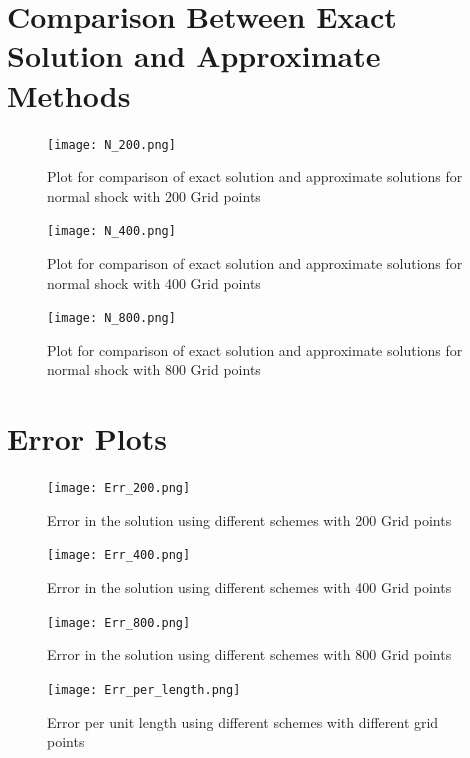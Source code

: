 \documentclass{article}
\begin{document}
\section*{Comparison Between Exact Solution and Approximate Methods}

\begin{figure}[H]   \label{figure}
\centering
\texttt{[image: N\_200.png]}
\label{figure:}
\caption{Plot for comparison of exact solution and approximate solutions for normal shock with 200 Grid points}
\end{figure}
\newpage

\begin{figure}[H]   \label{figure}
\centering
\texttt{[image: N\_400.png]}
\label{figure:}
\caption{Plot for comparison of exact solution and approximate solutions for normal shock with 400 Grid points}
\end{figure}
\newpage

\begin{figure}[H]   \label{figure}
\centering
\texttt{[image: N\_800.png]}
\label{figure:}
\caption{Plot for comparison of exact solution and approximate solutions for normal shock with 800 Grid points}
\end{figure}
\newpage

\section*{Error Plots}

\begin{figure}[H]   \label{figure}
\centering
\texttt{[image: Err\_200.png]}
\label{figure:}
\caption{Error in the solution using different schemes with 200 Grid points}
\end{figure}

\begin{figure}[H]   \label{figure}
\centering
\texttt{[image: Err\_400.png]}
\label{figure:}
\caption{Error in the solution using different schemes with 400 Grid points}
\end{figure}

\begin{figure}[H]   \label{figure}
\centering
\texttt{[image: Err\_800.png]}
\label{figure:}
\caption{Error in the solution using different schemes with 800 Grid points}
\end{figure}

\begin{figure}[H]   \label{figure}
\centering
\texttt{[image: Err\_per\_length.png]}
\label{figure:}
\caption{Error per unit length using different schemes with different grid points}
\end{figure}
\end{document}

